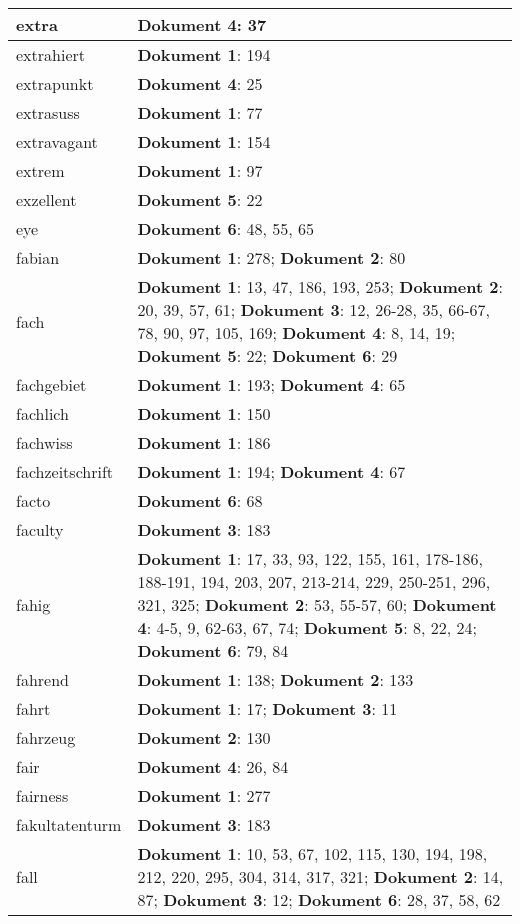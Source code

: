 \documentclass[a5paper]{article}
\begin{document}
\begin{longtable}[l]{|l|p{3in}|}
\hline
extra & \textbf{Dokument 4}: 37 \\
\hline
extrahiert & \textbf{Dokument 1}: 194 \\
\hline
extrapunkt & \textbf{Dokument 4}: 25 \\
\hline
extrasuss & \textbf{Dokument 1}: 77 \\
\hline
extravagant & \textbf{Dokument 1}: 154 \\
\hline
extrem & \textbf{Dokument 1}: 97 \\
\hline
exzellent & \textbf{Dokument 5}: 22 \\
\hline
eye & \textbf{Dokument 6}: 48, 55, 65 \\
\hline
fabian & \textbf{Dokument 1}: 278; \textbf{Dokument 2}: 80 \\
\hline
fach & \textbf{Dokument 1}: 13, 47, 186, 193, 253; \textbf{Dokument 2}: 20, 39, 57, 61; \textbf{Dokument 3}: 12, 26-28, 35, 66-67, 78, 90, 97, 105, 169; \textbf{Dokument 4}: 8, 14, 19; \textbf{Dokument 5}: 22; \textbf{Dokument 6}: 29 \\
\hline
fachgebiet & \textbf{Dokument 1}: 193; \textbf{Dokument 4}: 65 \\
\hline
fachlich & \textbf{Dokument 1}: 150 \\
\hline
fachwiss & \textbf{Dokument 1}: 186 \\
\hline
fachzeitschrift & \textbf{Dokument 1}: 194; \textbf{Dokument 4}: 67 \\
\hline
facto & \textbf{Dokument 6}: 68 \\
\hline
faculty & \textbf{Dokument 3}: 183 \\
\hline
fahig & \textbf{Dokument 1}: 17, 33, 93, 122, 155, 161, 178-186, 188-191, 194, 203, 207, 213-214, 229, 250-251, 296, 321, 325; \textbf{Dokument 2}: 53, 55-57, 60; \textbf{Dokument 4}: 4-5, 9, 62-63, 67, 74; \textbf{Dokument 5}: 8, 22, 24; \textbf{Dokument 6}: 79, 84 \\
\hline
fahrend & \textbf{Dokument 1}: 138; \textbf{Dokument 2}: 133 \\
\hline
fahrt & \textbf{Dokument 1}: 17; \textbf{Dokument 3}: 11 \\
\hline
fahrzeug & \textbf{Dokument 2}: 130 \\
\hline
fair & \textbf{Dokument 4}: 26, 84 \\
\hline
fairness & \textbf{Dokument 1}: 277 \\
\hline
fakultatenturm & \textbf{Dokument 3}: 183 \\
\hline
fall & \textbf{Dokument 1}: 10, 53, 67, 102, 115, 130, 194, 198, 212, 220, 295, 304, 314, 317, 321; \textbf{Dokument 2}: 14, 87; \textbf{Dokument 3}: 12; \textbf{Dokument 6}: 28, 37, 58, 62 \\

\end{longtable}
\end{document}
